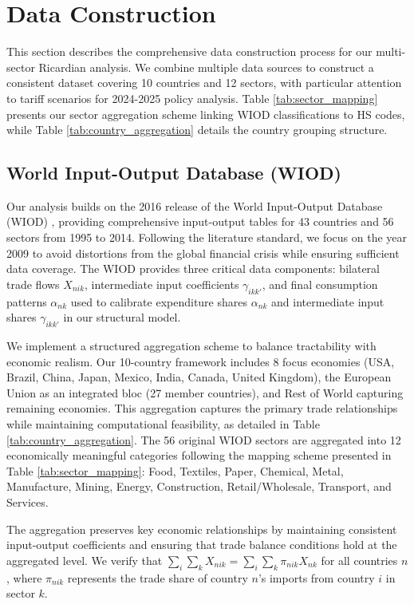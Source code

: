 \section{Data Construction}

This section describes the comprehensive data construction process for our multi-sector Ricardian analysis. We combine multiple data sources to construct a consistent dataset covering 10 countries and 12 sectors, with particular attention to tariff scenarios for 2024-2025 policy analysis. Table \ref{tab:sector_mapping} presents our sector aggregation scheme linking WIOD classifications to HS codes, while Table \ref{tab:country_aggregation} details the country grouping structure.

\subsection{World Input-Output Database (WIOD)}

Our analysis builds on the 2016 release of the World Input-Output Database (WIOD) \citep{stehrer2014wiod}, providing comprehensive input-output tables for 43 countries and 56 sectors from 1995 to 2014. Following the literature standard, we focus on the year 2009 to avoid distortions from the global financial crisis while ensuring sufficient data coverage. The WIOD provides three critical data components: bilateral trade flows $X_{nik}$, intermediate input coefficients $\gamma_{ikk'}$, and final consumption patterns $\alpha_{nk}$ used to calibrate expenditure shares $\alpha_{nk}$ and intermediate input shares $\gamma_{ikk'}$ in our structural model.

We implement a structured aggregation scheme to balance tractability with economic realism. Our 10-country framework includes 8 focus economies (USA, Brazil, China, Japan, Mexico, India, Canada, United Kingdom), the European Union as an integrated bloc (27 member countries), and Rest of World capturing remaining economies. This aggregation captures the primary trade relationships while maintaining computational feasibility, as detailed in Table \ref{tab:country_aggregation}. The 56 original WIOD sectors are aggregated into 12 economically meaningful categories following the mapping scheme presented in Table \ref{tab:sector_mapping}: Food, Textiles, Paper, Chemical, Metal, Manufacture, Mining, Energy, Construction, Retail/Wholesale, Transport, and Services.

The aggregation preserves key economic relationships by maintaining consistent input-output coefficients and ensuring that trade balance conditions hold at the aggregated level. We verify that $\sum_{i} \sum_{k} X_{nik} = \sum_{i} \sum_{k} \pi_{nik} X_{nk}$ for all countries $n$, where $\pi_{nik}$ represents the trade share of country $n$'s imports from country $i$ in sector $k$.

